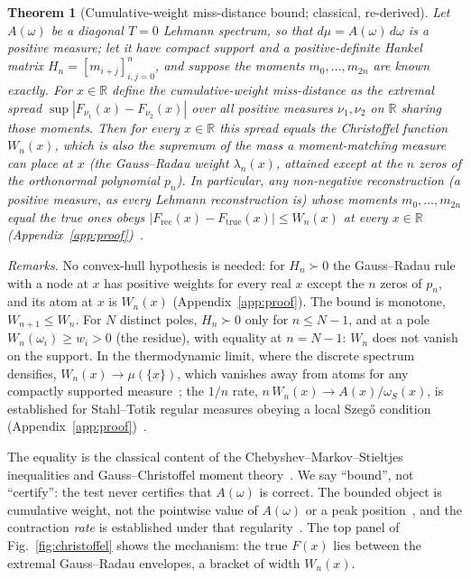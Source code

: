 \documentclass[submission, PhysCore]{SciPost}
\newtheorem{theorem}{Theorem}
\begin{document}
\begin{appendix}
\begin{theorem}[Cumulative-weight miss-distance bound; classical, re-derived]
\label{thm:christoffel}
Let $A(\omega)$ be a diagonal $T=0$ Lehmann spectrum, so that ${d\mu=A(\omega)\,d\omega}$ is a positive measure; let it have compact support and a positive-definite Hankel matrix $H_n=[m_{i+j}]_{i,j=0}^{n}$, and suppose the moments $m_0,\dots,m_{2n}$ are known exactly. For $x\in\mathbb{R}$ define the cumulative-weight miss-distance as the extremal spread $\sup|F_{\nu_1}(x)-F_{\nu_2}(x)|$ over all positive measures $\nu_1,\nu_2$ on $\mathbb{R}$ sharing those moments. Then for every $x\in\mathbb{R}$ this spread equals the Christoffel function $W_n(x)$, which is also the supremum of the mass a moment-matching measure can place at $x$ (the Gauss--Radau weight $\lambda_n(x)$, attained except at the $n$ zeros of the orthonormal polynomial $p_n$). In particular, any non-negative reconstruction (a positive measure, as every Lehmann reconstruction is) whose moments $m_0,\dots,m_{2n}$ equal the true ones obeys $|F_{\mathrm{rec}}(x)-F_{\mathrm{true}}(x)|\le W_n(x)$ at every $x\in\mathbb{R}$ (Appendix~\ref{app:proof})~\cite{KarlinStudden1966,DetteStudden1997}.
\end{theorem}

\noindent\emph{Remarks.} No convex-hull hypothesis is needed: for $H_n\succ0$ the Gauss--Radau rule with a node at $x$ has positive weights for every real $x$ except the $n$ zeros of $p_n$, and its atom at $x$ is $W_n(x)$ (Appendix~\ref{app:proof}). The bound is monotone, $W_{n+1}\le W_n$. For $N$ distinct poles, $H_n\succ0$ only for $n\le N-1$, and at a pole $W_n(\omega_i)\ge w_i>0$ (the residue), with equality at $n=N-1$: $W_n$ does not vanish on the support. In the thermodynamic limit, where the discrete spectrum densifies, $W_n(x)\to\mu(\{x\})$, which vanishes away from atoms for any compactly supported measure~\cite{ShohatTamarkin1943,Nevai1986}; the $1/n$ rate, $n\,W_n(x)\to A(x)/\omega_S(x)$, is established for Stahl--Totik regular measures obeying a local Szeg\H{o} condition (Appendix~\ref{app:proof})~\cite{Totik2000,MNT1991}.

The equality is the classical content of the Chebyshev--Markov--Stieltjes inequalities and Gauss--Christoffel moment theory~\cite{GM2010,ShohatTamarkin1943,Akhiezer1965}. We say ``bound'', not ``certify'': the test never certifies that $A(\omega)$ is correct. The bounded object is cumulative weight, not the pointwise value of $A(\omega)$ or a peak position~\cite{GM2010}, and the contraction \emph{rate} is established under that regularity~\cite{Totik2000,MNT1991}. The top panel of Fig.~\ref{fig:christoffel} shows the mechanism: the true $F(x)$ lies between the extremal Gauss--Radau envelopes, a bracket of width $W_n(x)$.


\end{appendix}
\end{document}
